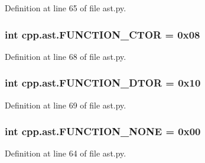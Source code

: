 Definition at line 65 of file ast.\+py.

\subsubsection[{\texorpdfstring{F\+U\+N\+C\+T\+I\+O\+N\+\_\+\+C\+T\+OR}{FUNCTION_CTOR}}]{\setlength{\rightskip}{0pt plus 5cm}int cpp.\+ast.\+F\+U\+N\+C\+T\+I\+O\+N\+\_\+\+C\+T\+OR = 0x08}\hypertarget{namespacecpp_1_1ast_ae380e31bf1bce9757f3289a704715c2d}{}\label{namespacecpp_1_1ast_ae380e31bf1bce9757f3289a704715c2d}


Definition at line 68 of file ast.\+py.

\subsubsection[{\texorpdfstring{F\+U\+N\+C\+T\+I\+O\+N\+\_\+\+D\+T\+OR}{FUNCTION_DTOR}}]{\setlength{\rightskip}{0pt plus 5cm}int cpp.\+ast.\+F\+U\+N\+C\+T\+I\+O\+N\+\_\+\+D\+T\+OR = 0x10}\hypertarget{namespacecpp_1_1ast_a4491e62237a2689be078bf3b455549e6}{}\label{namespacecpp_1_1ast_a4491e62237a2689be078bf3b455549e6}


Definition at line 69 of file ast.\+py.

\subsubsection[{\texorpdfstring{F\+U\+N\+C\+T\+I\+O\+N\+\_\+\+N\+O\+NE}{FUNCTION_NONE}}]{\setlength{\rightskip}{0pt plus 5cm}int cpp.\+ast.\+F\+U\+N\+C\+T\+I\+O\+N\+\_\+\+N\+O\+NE = 0x00}\hypertarget{namespacecpp_1_1ast_a8f1229df8e1348664a7e6142c2d0ae0b}{}\label{namespacecpp_1_1ast_a8f1229df8e1348664a7e6142c2d0ae0b}


Definition at line 64 of file ast.\+py.

